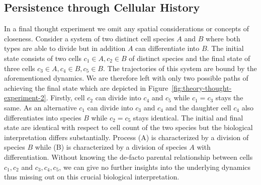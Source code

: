 \subsection{Persistence through Cellular History}
In a final thought experiment we omit any spatial considerations or concepts of closeness.
Consider a system of two distinct cell species $A$ and $B$ where both types are able to divide but
in addition $A$ can differentiate into $B$.
The initial state consists of two cells $c_1\in A,c_2\in B$ of distinct species and the final state
of three cells $c_3\in A,c_4\in B,c_5\in B$.
The trajectories of this system are bound by the aforementioned dynamics.
We are therefore left with only two possible paths of achieving the final state which are depicted
in Figure~\ref{fig:theory-thought-experiment-2}.
Firstly, cell $c_2$ can divide into $c_4$ and $c_5$ while $c_1=c_3$ stays the same.
As an alternative $c_1$ can divide into $c_3$ and $c_4$ and the daughter cell $c_4$ also
differentiates into species $B$ while $c_2=c_5$ stays identical.
The initial and final state are identical with respect to cell count of the two species but the
biological interpretation differs substantially.
Process (A) is characterized by a division of species $B$ while (B) is characterized by a
division of species $A$ with differentiation.
Without knowing the de-facto parental relationship between cells $c_1,c_2$ and $c_3,c_4,c_5$, we can
give no further insights into the underlying dynamics thus missing out on this crucial biological
interpretation.

